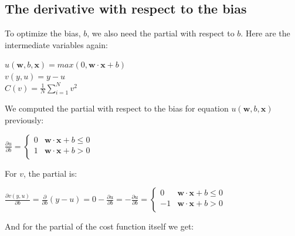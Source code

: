 \documentclass[11pt]{article}
\begin{document}
\subsection{The derivative with respect to the bias}


To optimize the bias, $b$, we also need the partial with respect to $b$.  Here are the intermediate variables again:

$u(\mathbf{w},b,\mathbf{x}) = max(0, \mathbf{w}\cdot\mathbf{x}+b)$\\
$v(y,u) = y - u$\\
$C(v) = \frac{1}{N} \sum_{i=1}^N v^2$

We computed the partial with respect to the bias for equation $u(\mathbf{w},b,\mathbf{x})$ previously:

$\frac{\partial u}{\partial b} = \begin{cases}
	0 & \mathbf{w} \cdot \mathbf{x} + b \leq 0\\
	1 & \mathbf{w} \cdot \mathbf{x} + b > 0\\
\end{cases}
$

For $v$, the partial is:

$
\frac{\partial v(y,u)}{\partial b} = \frac{\partial}{\partial b} (y - u) = 0 - \frac{\partial u}{\partial b} = -\frac{\partial u}{\partial b} = \begin{cases}
	0 & \mathbf{w} \cdot \mathbf{x} + b \leq 0\\
	-1 & \mathbf{w} \cdot \mathbf{x} + b > 0\\
\end{cases}
$

And for the partial of the cost function itself we get:
\end{document}
